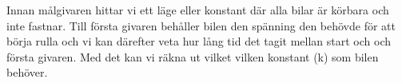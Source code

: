 Innan målgivaren hittar vi ett läge eller konstant där alla bilar är körbara och inte fastnar. Till första givaren behåller bilen den spänning den behövde för att börja rulla och vi kan därefter veta hur lång tid det tagit mellan start och och första givaren. Med det kan vi räkna ut vilket vilken konstant (k) som bilen behöver. 